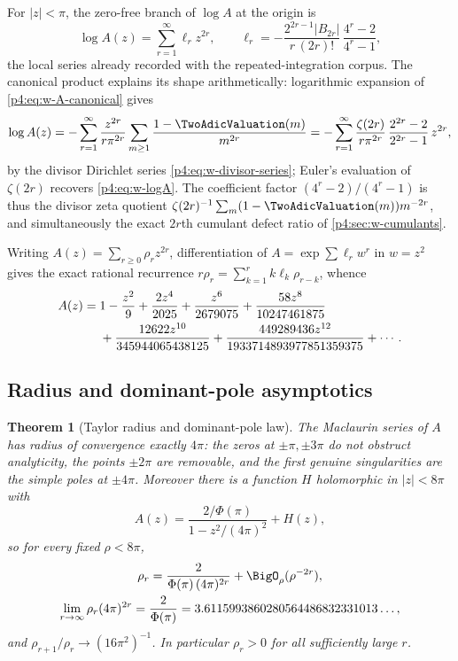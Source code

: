 \documentclass[11pt,oneside]{article}
\numberwithin{equation}{section}
\newtheorem{theorem}{Theorem}[section]
\theoremstyle{definition}
\theoremstyle{remark}
\begin{document}
For $|z|<\pi$, the zero-free branch of $\log A$ at the origin is
\begin{equation}
 \log A(z)=\sum_{r=1}^{\infty}\ell_rz^{2r},
 \qquad
 \ell_r=-\frac{2^{2r-1}|B_{2r}|}{r\,(2r)!}\,
 \frac{4^r-2}{4^r-1},
 \label{p4:eq:w-logA}
\end{equation}
the local series already recorded with the repeated-integration corpus.
The canonical product explains its shape arithmetically: logarithmic
expansion of \eqref{p4:eq:w-A-canonical} gives
\begin{equation}
 \log A(z)
 =-\sum_{r=1}^{\infty}\frac{z^{2r}}{r\pi^{2r}}
 \sum_{m\ge1}\frac{1-\TwoAdicValuation(m)}{m^{2r}}
 =-\sum_{r=1}^{\infty}
 \frac{\zeta(2r)}{r\pi^{2r}}\,\frac{2^{2r}-2}{2^{2r}-1}\,z^{2r},
 \label{p4:eq:w-logA-zeta}
\end{equation}
by the divisor Dirichlet series \eqref{p4:eq:w-divisor-series}; Euler's
evaluation of $\zeta(2r)$ recovers \eqref{p4:eq:w-logA}.  The coefficient
factor $(4^r-2)/(4^r-1)$ is thus the divisor zeta quotient
$\zeta(2r)^{-1}\sum_m(1-\TwoAdicValuation(m))m^{-2r}$, and simultaneously the exact
$2r$th cumulant defect ratio of \cref{p4:sec:w-cumulants}.

Writing $A(z)=\sum_{r\ge0}\rho_rz^{2r}$, differentiation of
$A=\exp\sum\ell_rw^r$ in $w=z^2$ gives the exact rational recurrence
$r\rho_r=\sum_{k=1}^{r}k\ell_k\rho_{r-k}$, whence
\begin{align}
 A(z)={}&1-\frac{z^2}{9}+\frac{2z^4}{2025}
 +\frac{z^6}{2679075}
 +\frac{58z^8}{10247461875}\notag\\
 &+\frac{12622z^{10}}{345944065438125}
 +\frac{449289436z^{12}}{1933714893977851359375}+\cdots.
 \label{p4:eq:w-A-first-terms}
\end{align}

\subsection{Radius and dominant-pole asymptotics}

\begin{theorem}[Taylor radius and dominant-pole law]
\label{p4:thm:w-radius}
The Maclaurin series of $A$ has radius of convergence exactly $4\pi$: the
zeros at $\pm\pi,\pm3\pi$ do not obstruct analyticity, the points $\pm2\pi$
are removable, and the first genuine singularities are the simple poles at
$\pm4\pi$.  Moreover there is a function $H$ holomorphic in $|z|<8\pi$ with
\begin{equation}
 A(z)=\frac{2/\Phi(\pi)}{1-z^2/(4\pi)^2}+H(z),
 \label{p4:eq:w-pole-split}
\end{equation}
so for every fixed $\rho<8\pi$,
\begin{equation}
\begin{gathered}
 \rho_r=\frac{2}{\Phi(\pi)\,(4\pi)^{2r}}
 +\BigO_\rho(\rho^{-2r}),\\
 \lim_{r\to\infty}\rho_r(4\pi)^{2r}=\frac{2}{\Phi(\pi)}
 =3.6115993860280564486832331013\ldots,
\end{gathered}
 \label{p4:eq:w-rho-asymptotic}
\end{equation}
and $\rho_{r+1}/\rho_r\to(16\pi^2)^{-1}$.  In particular $\rho_r>0$ for all
sufficiently large $r$.
\end{theorem}
\end{document}
